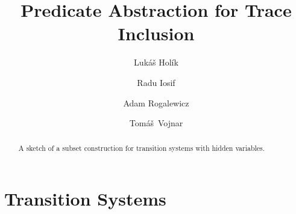 \documentclass[10pt]{llncs}
\begin{document}

\title{Predicate Abstraction for Trace Inclusion}

\author{Luk\'{a}\v{s} Hol\'{i}k \and Radu Iosif \and Adam Rogalewicz \and
Tom\'{a}\v{s}~Vojnar}
  
  
 \maketitle


\begin{abstract}
A sketch of a subset construction for transition systems with hidden variables.
\end{abstract}


\section{Transition Systems}
\end{document}
